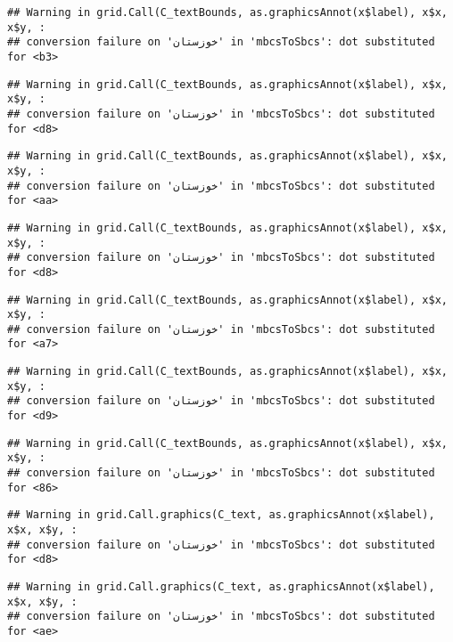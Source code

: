 \documentclass[
]{article}
\begin{document}
\begin{verbatim}
## Warning in grid.Call(C_textBounds, as.graphicsAnnot(x$label), x$x, x$y, :
## conversion failure on 'خوزستان' in 'mbcsToSbcs': dot substituted for <b3>
\end{verbatim}

\begin{verbatim}
## Warning in grid.Call(C_textBounds, as.graphicsAnnot(x$label), x$x, x$y, :
## conversion failure on 'خوزستان' in 'mbcsToSbcs': dot substituted for <d8>
\end{verbatim}

\begin{verbatim}
## Warning in grid.Call(C_textBounds, as.graphicsAnnot(x$label), x$x, x$y, :
## conversion failure on 'خوزستان' in 'mbcsToSbcs': dot substituted for <aa>
\end{verbatim}

\begin{verbatim}
## Warning in grid.Call(C_textBounds, as.graphicsAnnot(x$label), x$x, x$y, :
## conversion failure on 'خوزستان' in 'mbcsToSbcs': dot substituted for <d8>
\end{verbatim}

\begin{verbatim}
## Warning in grid.Call(C_textBounds, as.graphicsAnnot(x$label), x$x, x$y, :
## conversion failure on 'خوزستان' in 'mbcsToSbcs': dot substituted for <a7>
\end{verbatim}

\begin{verbatim}
## Warning in grid.Call(C_textBounds, as.graphicsAnnot(x$label), x$x, x$y, :
## conversion failure on 'خوزستان' in 'mbcsToSbcs': dot substituted for <d9>
\end{verbatim}

\begin{verbatim}
## Warning in grid.Call(C_textBounds, as.graphicsAnnot(x$label), x$x, x$y, :
## conversion failure on 'خوزستان' in 'mbcsToSbcs': dot substituted for <86>
\end{verbatim}

\begin{verbatim}
## Warning in grid.Call.graphics(C_text, as.graphicsAnnot(x$label), x$x, x$y, :
## conversion failure on 'خوزستان' in 'mbcsToSbcs': dot substituted for <d8>
\end{verbatim}

\begin{verbatim}
## Warning in grid.Call.graphics(C_text, as.graphicsAnnot(x$label), x$x, x$y, :
## conversion failure on 'خوزستان' in 'mbcsToSbcs': dot substituted for <ae>
\end{verbatim}
\end{document}
